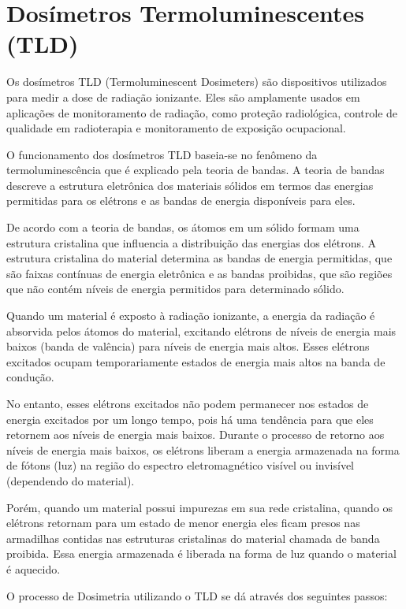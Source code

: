 \documentclass[11pt,a4paper]{article}
\begin{document}
	\section{Dosímetros Termoluminescentes (TLD)}

		Os dosímetros TLD (Termoluminescent Dosimeters) são dispositivos utilizados para medir a dose de radiação ionizante. Eles são amplamente usados em aplicações de monitoramento de radiação, como proteção radiológica, controle de qualidade em radioterapia e monitoramento de exposição ocupacional.

		O funcionamento dos dosímetros TLD baseia-se no fenômeno da termoluminescência que é explicado pela teoria de bandas. A teoria de bandas descreve a estrutura eletrônica dos materiais sólidos em termos das energias permitidas para os elétrons e as bandas de energia disponíveis para eles.

		De acordo com a teoria de bandas, os átomos em um sólido formam uma estrutura cristalina que influencia a distribuição das energias dos elétrons. A estrutura cristalina do material determina as bandas de energia permitidas, que são faixas contínuas de energia eletrônica e as bandas proibidas, que são regiões que não contém níveis de energia permitidos para determinado sólido.
		
		Quando um material é exposto à radiação ionizante, a energia da radiação é absorvida pelos átomos do material, excitando elétrons de níveis de energia mais baixos (banda de valência) para níveis de energia mais altos. Esses elétrons excitados ocupam temporariamente estados de energia mais altos na banda de condução.
		
		No entanto, esses elétrons excitados não podem permanecer nos estados de energia excitados por um longo tempo, pois há uma tendência para que eles retornem aos níveis de energia mais baixos. Durante o processo de retorno aos níveis de energia mais baixos, os elétrons liberam a energia armazenada na forma de fótons (luz) na região do espectro eletromagnético visível ou invisível (dependendo do material).
		
		Porém, quando um material possui impurezas em sua rede cristalina, quando os elétrons retornam para um estado de menor energia eles ficam presos nas armadilhas contidas nas estruturas cristalinas do material chamada de banda proibida. Essa energia armazenada é liberada na forma de luz quando o material é aquecido.
	
		O processo de Dosimetria utilizando o TLD se dá através dos seguintes passos:
\end{document}
